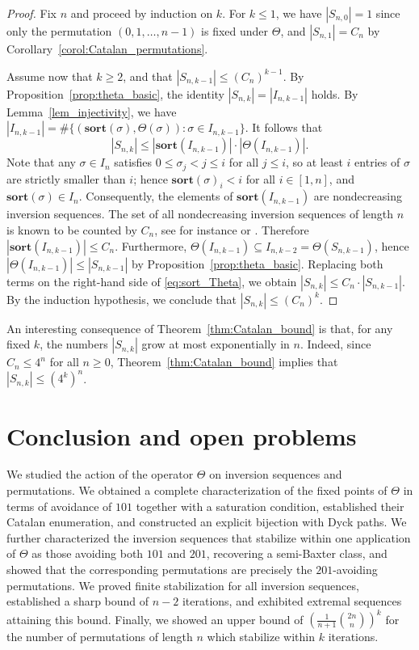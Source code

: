 \documentclass[11pt]{article}
\theoremstyle{remark}
\theoremstyle{definition}
\newcommand{\sort}{\mathbf{sort}}
\begin{document}
\begin{proof}
    Fix $n$ and proceed by induction on $k$. For $k \leq 1$, we have $|S_{n,0}| = 1$ since only the permutation $(0,1, \dots, n-1)$ is fixed under $\Theta$, and $|S_{n,1}| = C_n$ by Corollary~\ref{corol:Catalan_permutations}.
    
    Assume now that $k \geq 2$, and that $|S_{n,k-1}| \leq (C_n)^{k-1}$. By Proposition~\ref{prop:theta_basic}, the identity ${|S_{n,k}| = |I_{n,k-1}|}$ holds. By Lemma~\ref{lem_injectivity}, we have $|I_{n,k-1}| = \#\{(\sort(\sigma), \Theta(\sigma))  :  \sigma \in I_{n,k-1}\}$. It follows that
    \begin{equation} \label{eq:sort_Theta}
        |S_{n,k}| \leq |\sort(I_{n,k-1})| \cdot |\Theta(I_{n,k-1})|.
    \end{equation}
    Note that any $\sigma \in I_n$ satisfies $0 \leq \sigma_j < j \leq i$ for all $j \leq i$, so at least $i$ entries of $\sigma$ are strictly smaller than $i$; hence $\sort(\sigma)_i < i$ for all $i \in [1,n]$, and $\sort(\sigma) \in I_n$. Consequently, the elements of $\sort(I_{n,k-1})$ are nondecreasing inversion sequences. The set of all nondecreasing inversion sequences of length $n$ is known to be counted by $C_n$, see for instance \cite[Section 2.14.1]{Martinez_Savage_2018} or \cite[Section 2.1]{Testart_2025}. Therefore $|\sort(I_{n,k-1})| \leq C_n$.
    Furthermore, ${\Theta(I_{n,k-1}) \subseteq I_{n,k-2} = \Theta(S_{n,k-1})}$, hence $|\Theta(I_{n,k-1})| \leq |S_{n,k-1}|$ by Proposition~\ref{prop:theta_basic}. Replacing both terms on the right-hand side of \eqref{eq:sort_Theta}, we obtain ${|S_{n,k}| \leq C_n \cdot |S_{n,k-1}|}$. By the induction hypothesis, we conclude that $|S_{n,k}| \leq (C_n)^k$.
\end{proof}

An interesting consequence of Theorem~\ref{thm:Catalan_bound} is that, for any fixed $k$, the numbers $|S_{n,k}|$ grow at most exponentially in $n$. Indeed, since $C_n \leq 4^n$ for all $n \geq 0$, Theorem~\ref{thm:Catalan_bound} implies that $|S_{n,k}| \leq (4^k)^n$.

\section{Conclusion and open problems}

We studied the action of the operator $\Theta$ on inversion sequences and permutations. We obtained a complete characterization of the fixed points of $\Theta$ in terms of avoidance of $101$ together with a saturation condition, established their Catalan enumeration, and constructed an explicit bijection with Dyck paths. We further characterized the inversion sequences that stabilize within one application of $\Theta$ as those avoiding both $101$ and $201$, recovering a semi-Baxter class, and showed that the corresponding permutations are precisely the $201$-avoiding permutations. We proved finite stabilization for all inversion sequences, established a sharp bound of $n-2$ iterations, and exhibited extremal sequences attaining this bound. Finally, we showed an upper bound of $\left (\frac{1}{n+1}\binom{2n}{n} \right )^k$ for the number of permutations of length $n$ which stabilize within $k$ iterations.
\end{document}
